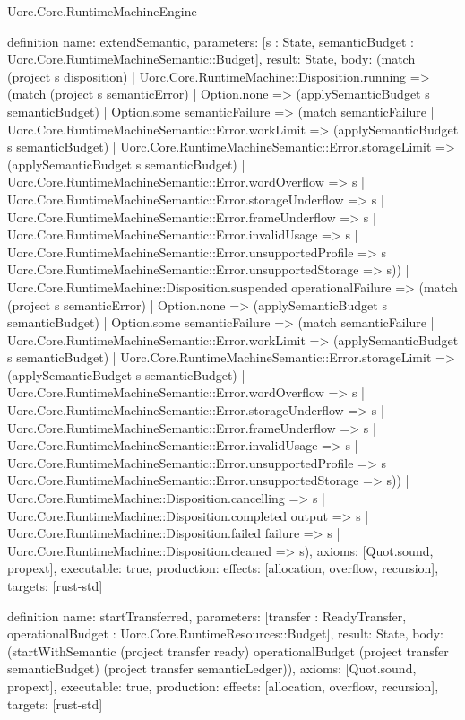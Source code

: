 \begin{lexlean}{Uorc.Core.RuntimeMachineEngine}
\begin{semanticmodule}
definition{
  name: extendSemantic,
  parameters: [s : State, semanticBudget : Uorc.Core.RuntimeMachineSemantic::Budget],
  result: State,
  body: (match (project s disposition)
    | Uorc.Core.RuntimeMachine::Disposition.running => (match (project s semanticError)
      | Option.none => (applySemanticBudget s semanticBudget)
      | Option.some semanticFailure => (match semanticFailure
        | Uorc.Core.RuntimeMachineSemantic::Error.workLimit => (applySemanticBudget s semanticBudget)
        | Uorc.Core.RuntimeMachineSemantic::Error.storageLimit => (applySemanticBudget s semanticBudget)
        | Uorc.Core.RuntimeMachineSemantic::Error.wordOverflow => s
        | Uorc.Core.RuntimeMachineSemantic::Error.storageUnderflow => s
        | Uorc.Core.RuntimeMachineSemantic::Error.frameUnderflow => s
        | Uorc.Core.RuntimeMachineSemantic::Error.invalidUsage => s
        | Uorc.Core.RuntimeMachineSemantic::Error.unsupportedProfile => s
        | Uorc.Core.RuntimeMachineSemantic::Error.unsupportedStorage => s))
    | Uorc.Core.RuntimeMachine::Disposition.suspended operationalFailure => (match (project s semanticError)
      | Option.none => (applySemanticBudget s semanticBudget)
      | Option.some semanticFailure => (match semanticFailure
        | Uorc.Core.RuntimeMachineSemantic::Error.workLimit => (applySemanticBudget s semanticBudget)
        | Uorc.Core.RuntimeMachineSemantic::Error.storageLimit => (applySemanticBudget s semanticBudget)
        | Uorc.Core.RuntimeMachineSemantic::Error.wordOverflow => s
        | Uorc.Core.RuntimeMachineSemantic::Error.storageUnderflow => s
        | Uorc.Core.RuntimeMachineSemantic::Error.frameUnderflow => s
        | Uorc.Core.RuntimeMachineSemantic::Error.invalidUsage => s
        | Uorc.Core.RuntimeMachineSemantic::Error.unsupportedProfile => s
        | Uorc.Core.RuntimeMachineSemantic::Error.unsupportedStorage => s))
    | Uorc.Core.RuntimeMachine::Disposition.cancelling => s
    | Uorc.Core.RuntimeMachine::Disposition.completed output => s
    | Uorc.Core.RuntimeMachine::Disposition.failed failure => s
    | Uorc.Core.RuntimeMachine::Disposition.cleaned => s),
  axioms: [Quot.sound, propext],
  executable: true,
  production: {effects: [allocation, overflow, recursion], targets: [rust-std]}
}

definition{
  name: startTransferred,
  parameters: [transfer : ReadyTransfer, operationalBudget : Uorc.Core.RuntimeResources::Budget],
  result: State,
  body: (startWithSemantic (project transfer ready) operationalBudget (project transfer semanticBudget) (project transfer semanticLedger)),
  axioms: [Quot.sound, propext],
  executable: true,
  production: {effects: [allocation, overflow, recursion], targets: [rust-std]}
}
\end{semanticmodule}
\end{lexlean}
